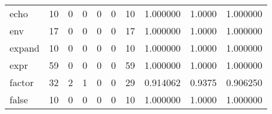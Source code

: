 \begin{longtable}{lrrrrrrrrr}
echo      &                                       10 &                                                  0 &                                                  0 &                                                  0 &                                                  0 &                                                 10 &                                           1.000000 &                                 1.0000 &                             1.000000 \\
env       &                                       17 &                                                  0 &                                                  0 &                                                  0 &                                                  0 &                                                 17 &                                           1.000000 &                                 1.0000 &                             1.000000 \\
expand    &                                       10 &                                                  0 &                                                  0 &                                                  0 &                                                  0 &                                                 10 &                                           1.000000 &                                 1.0000 &                             1.000000 \\
expr      &                                       59 &                                                  0 &                                                  0 &                                                  0 &                                                  0 &                                                 59 &                                           1.000000 &                                 1.0000 &                             1.000000 \\
factor    &                                       32 &                                                  2 &                                                  1 &                                                  0 &                                                  0 &                                                 29 &                                           0.914062 &                                 0.9375 &                             0.906250 \\
false     &                                       10 &                                                  0 &                                                  0 &                                                  0 &                                                  0 &                                                 10 &                                           1.000000 &                                 1.0000 &                             1.000000 \\

\end{longtable}
